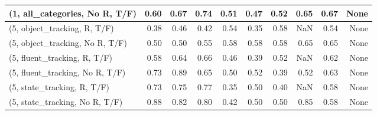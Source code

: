 \begin{table*}[h!]
\begin{adjustbox}{width=2\columnwidth,center}
\begin{tabular}{lrrr|rrr|rrr}
(1, all\_categories, No R, T/F)       &                      0.60 &                  0.67 &                      0.74 &                          0.51 &                      0.47 &                          0.52 &                                   0.65 &                               0.67 &                                  None \\



\midrule
(5, object\_tracking, R, T/F)         &                      0.38 &                  0.46 &                      0.42 &                          0.54 &                      0.35 &                          0.58 &                                    NaN &                               0.54 &                                  None \\
(5, object\_tracking, No R, T/F)      &                      0.50 &                  0.50 &                      0.55 &                          0.58 &                      0.58 &                          0.58 &                                   0.65 &                               0.65 &                                  None \\
(5, fluent\_tracking, R, T/F)         &                      0.58 &                  0.64 &                      0.66 &                          0.46 &                      0.39 &                          0.52 &                                    NaN &                               0.62 &                                  None \\
(5, fluent\_tracking, No R, T/F)      &                      0.73 &                  0.89 &                      0.65 &                          0.50 &                      0.52 &                          0.39 &                                   0.52 &                               0.63 &                                  None \\
(5, state\_tracking, R, T/F)          &                      0.73 &                  0.75 &                      0.77 &                          0.35 &                      0.50 &                          0.40 &                                    NaN &                               0.58 &                                  None \\
(5, state\_tracking, No R, T/F)       &                      0.88 &                  0.82 &                      0.80 &                          0.42 &                      0.50 &                          0.50 &                                   0.85 &                               0.58 &                                  None \\

\end{tabular}
\end{adjustbox}
\end{table*}
